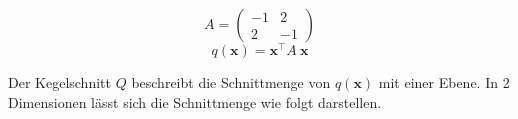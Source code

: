 \begin{figure}[h]
    \centering
    \begin{minipage}{0.32\textwidth}
        \centering
        \begin{equation*}
            A = \begin{pmatrix} -1 & 2 \\ 2 & -1 \end{pmatrix}
        \end{equation*}
        \begin{equation*}
            q(\mathbf{x}) = \mathbf{x}^\top A \  \mathbf{x} 
        \end{equation*}
    \end{minipage}
    \begin{minipage}{0.45\textwidth}
    \end{minipage}
\end{figure}

Der Kegelschnitt \( Q \) beschreibt die Schnittmenge von \( q(\mathbf{x}) \) mit einer Ebene. In 2 Dimensionen lässt sich die Schnittmenge wie folgt darstellen. 

